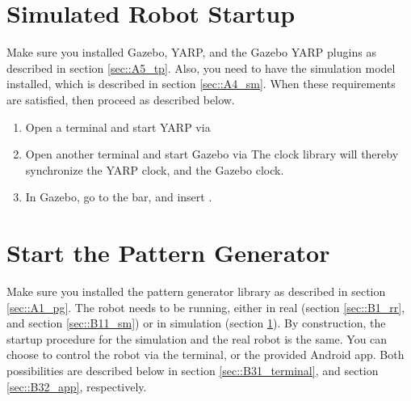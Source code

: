\section{Simulated Robot Startup}
\label{sec::B2_ss}
Make sure you installed Gazebo, YARP, and the Gazebo YARP plugins as described in section \ref{sec::A5_tp}. Also, you need to have the simulation model installed, which is described in section \ref{sec::A4_sm}. When these requirements are satisfied, then proceed as described below.
\begin{enumerate}
	\item Open a terminal and start YARP via \newline {} \newline
	\item Open another terminal and start Gazebo via \newline {}\newline The clock library will thereby synchronize the YARP clock, and the Gazebo clock.
	\item  In Gazebo, go to the  bar, and insert .
\end{enumerate}
\FloatBarrier
\section{Start the Pattern Generator}
\label{sec::B3_sp}
Make sure you installed the pattern generator library as described in section \ref{sec::A1_pg}. The robot needs to be running, either in real (section \ref{sec::B1_rr}, and section \ref{sec::B11_sm}) or in simulation (section \ref{sec::B2_ss}). By construction, the startup procedure for the simulation and the real robot is the same. You can choose to control the robot via the terminal, or the provided Android app. Both possibilities are described below in section \ref{sec::B31_terminal}, and section \ref{sec::B32_app}, respectively.
\FloatBarrier
